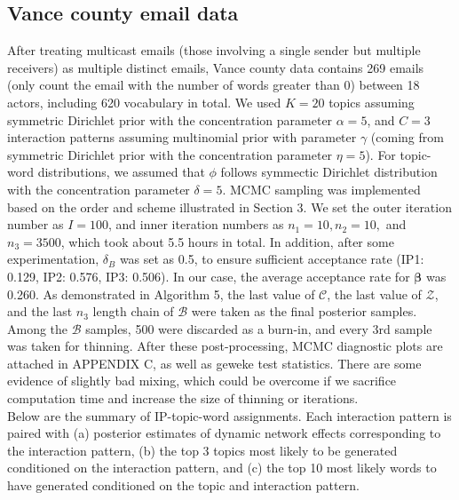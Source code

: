 \documentclass[a4paper]{article}
\begin{document}
\subsection{Vance county email data}
After treating multicast emails (those involving a single sender but multiple receivers) as multiple distinct emails, Vance county data contains 269 emails (only count the email with the number of words greater than 0) between 18 actors, including 620 vocabulary in total. We used $K=20$ topics assuming symmetric Dirichlet prior with the concentration parameter $\alpha=5$, and $C=3$ interaction patterns assuming multinomial prior with parameter $\gamma$ (coming from symmetric Dirichlet prior with the concentration parameter $\eta = 5$). For topic-word distributions, we assumed that $\phi$ follows symmectic Dirichlet distribution with the concentration parameter $\delta=5$. MCMC sampling was implemented based on the order and scheme illustrated in Section 3. We set the outer iteration number as $I=100$, and inner iteration numbers as $n_1=10, n_2=10,$ and $n_3=3500$, which took about 5.5 hours in total. In addition, after some experimentation, $\delta_B$ was set as 0.5, to ensure sufficient acceptance rate (IP1: 0.129, IP2: 0.576, IP3: 0.506). In our case, the average acceptance rate for $\boldsymbol{\beta}$ was 0.260. As demonstrated in Algorithm 5, the last value of $\mathcal{C}$, the last value of $\mathcal{Z}$, and the last $n_3$ length chain of $\mathcal{B}$ were taken as the final posterior samples. Among the $\mathcal{B}$ samples, 500 were discarded as a burn-in, and every 3rd sample was taken for thinning. After these post-processing, MCMC diagnostic plots are attached in APPENDIX C, as well as geweke test statistics. There are some evidence of slightly bad mixing, which could be overcome if we sacrifice computation time and increase the size of thinning or iterations. \\\newline
Below are the summary of IP-topic-word assignments. Each interaction pattern is paired with (a) posterior estimates of dynamic network effects corresponding to the interaction pattern, (b) the top 3 topics most likely to be generated conditioned on the interaction pattern, and (c) the top 10 most likely words to have generated conditioned on the topic and interaction pattern.
\footnotesize
\end{document}
